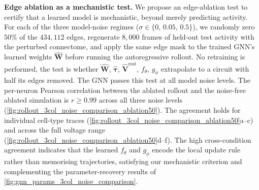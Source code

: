 \documentclass{article}
\begin{document}
\textbf{Edge ablation as a mechanistic test.}
We propose an edge-ablation test to certify that a learned model is
mechanistic, beyond merely predicting activity. For each of the {\color{revised}three model-noise regimes} ($\sigma \in \{0,\,0.05,\,0.5\}$), we randomly zero $50\%$ of the
$434{,}112$ edges, regenerate $8{,}000$ frames of held-out test
activity with the perturbed connectome, and apply the same edge mask
to the trained GNN's learned weights $\hat{\mathbf{W}}$ before
running the autoregressive rollout. No retraining is performed, the
test is whether $\hat{\mathbf{W}}$, $\hat{\boldsymbol{\tau}}$,
$\hat{\mathbf{V}}^{\mathrm{rest}}$, $f_\theta$, $g_\phi$
extrapolate to a circuit with half its edges removed. The GNN passes this test at all model noise levels. The per-neuron Pearson correlation between the ablated rollout and the noise-free ablated simulation is $r \geq 0.99$ across all three noise levels
(\cref{fig:rollout_3col_noise_comparison_ablation50}). The
agreement holds for individual cell-type traces (\cref{fig:rollout_3col_noise_comparison_ablation50}a--c) and
across the full voltage range (\cref{fig:rollout_3col_noise_comparison_ablation50}d--f). The high cross-condition
agreement indicates that the learned $f_\theta$ and $g_\phi$ encode
the local update rule rather than memorising trajectories, satisfying
our mechanistic criterion and complementing the parameter-recovery
results of \cref{fig:gnn_params_3col_noise_comparison}.
\end{document}
